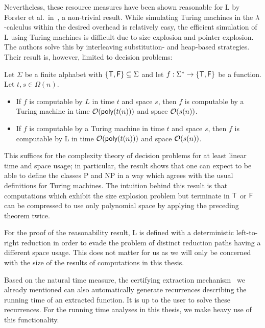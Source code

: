 Nevertheless, these resource measures have been shown reasonable for L by Forster et al.\ in~\cite{ForsterKunzeRoth:2019:wcbv-Reasonable}, a non-trivial result. While simulating Turing machines in the $\lambda$-calculus within the desired overhead is relatively easy, the efficient simulation of L using Turing machines is difficult due to size explosion and pointer explosion. The authors solve this by interleaving substitution- and heap-based strategies.
Their result is, however, limited to decision problems:
\begin{theorem}
  Let $\Sigma$ be a finite alphabet with $\{\mathsf{T}, \mathsf{F}\} \subseteq \Sigma$ and let $f : \Sigma^* \rightarrow \{\mathsf{T}, \mathsf{F}\}$ be a function. Let $t, s \in \Omega(n)$. 
  \begin{itemize}
    \item If $f$ is computable by $L$ in time $t$ and space $s$, then $f$ is computable by a Turing machine in time $\mathcal{O}{(\textsf{poly}(t(n)))}$ and space $\mathcal{O}{(s(n))}$.
    \item If $f$ is computable by a Turing machine in time $t$ and space $s$, then $f$ is computable by L in time $\mathcal{O}{(\textsf{poly}(t(n)))}$ and space $\mathcal{O}{(s(n))}$. 
  \end{itemize}
\end{theorem}
This suffices for the complexity theory of decision problems for at least linear time and space usage; in particular, the result shows that one can expect to be able to define the classes \textsf{P} and \textsf{NP} in a way which agrees with the usual definitions for Turing machines. 
The intuition behind this result is that computations which exhibit the size explosion problem but terminate in $\mathsf{T}$ or $\mathsf{F}$ can be compressed to use only polynomial space by applying the preceding theorem twice.

\begin{remark}
  For the proof of the reasonability result, L is defined with a deterministic left-to-right reduction in order to evade the problem of distinct reduction paths having a different space usage. This does not matter for us as we will only be concerned with the size of the results of computations in this thesis.
\end{remark}

Based on the natural time measure, the certifying extraction mechanism~\cite{ForsterKunze:2019:Certifying-extraction} we already mentioned can also automatically generate recurrences describing the running time of an extracted function. It is up to the user to solve these recurrences.
For the running time analyses in this thesis, we make heavy use of this functionality.


